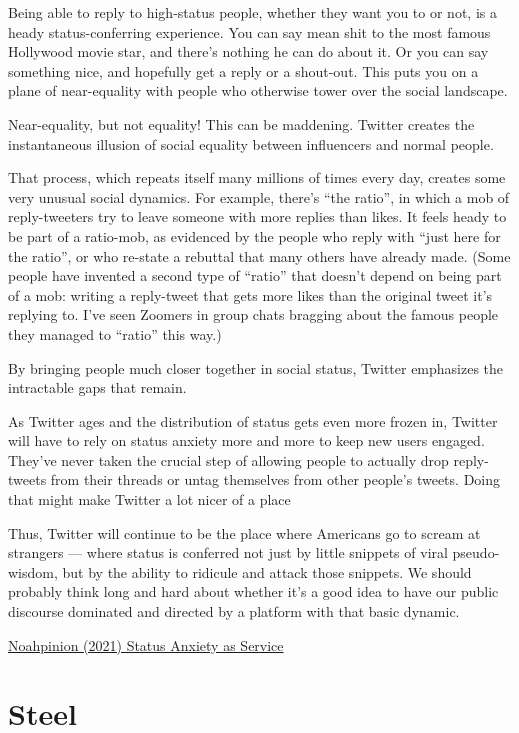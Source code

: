 \documentclass[
]{book}
\begin{document}
Being able to reply to high-status people, whether they want you to or not, is a heady status-conferring experience. You can say mean shit to the most famous Hollywood movie star, and there's nothing he can do about it. Or you can say something nice, and hopefully get a reply or a shout-out. This puts you on a plane of near-equality with people who otherwise tower over the social landscape.

Near-equality, but not equality!
This can be maddening. Twitter creates the instantaneous illusion of social equality between influencers and normal people.

That process, which repeats itself many millions of times every day, creates some very unusual social dynamics. For example, there's ``the ratio'', in which a mob of reply-tweeters try to leave someone with more replies than likes. It feels heady to be part of a ratio-mob, as evidenced by the people who reply with ``just here for the ratio'', or who re-state a rebuttal that many others have already made. (Some people have invented a second type of ``ratio'' that doesn't depend on being part of a mob: writing a reply-tweet that gets more likes than the original tweet it's replying to. I've seen Zoomers in group chats bragging about the famous people they managed to ``ratio'' this way.)

By bringing people much closer together in social status, Twitter emphasizes the intractable gaps that remain.

As Twitter ages and the distribution of status gets even more frozen in, Twitter will have to rely on status anxiety more and more to keep new users engaged.
They've never taken the crucial step of allowing people to actually drop reply-tweets from their threads or untag themselves from other people's tweets. Doing that might make Twitter a lot nicer of a place

Thus, Twitter will continue to be the place where Americans go to scream at strangers --- where status is conferred not just by little snippets of viral pseudo-wisdom, but by the ability to ridicule and attack those snippets. We should probably think long and hard about whether it's a good idea to have our public discourse dominated and directed by a platform with that basic dynamic.

\href{https://noahpinion.substack.com/p/status-anxiety-as-a-service}{Noahpinion (2021) Status Anxiety as Service}

\hypertarget{steel}{%
\chapter{Steel}\label{steel}}
\end{document}

